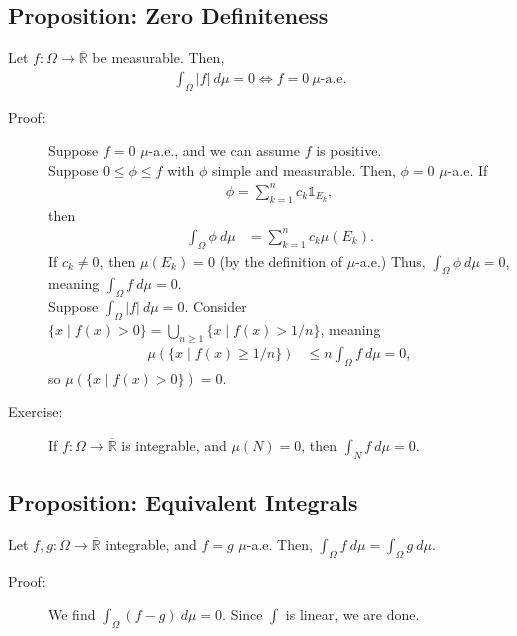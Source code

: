 \documentclass[9pt]{extarticle}
\newcommand{\R}{\mathbb{R}}
\begin{document}
  \subsection{Proposition: Zero Definiteness}%
  Let $f: \Omega \rightarrow \overline{\R}$ be measurable. Then,
  \begin{align*}
    \int_{\Omega}|f|~d\mu = 0 \Leftrightarrow f = 0~\text{$\mu$-a.e.}
  \end{align*}
  \begin{description}
    \item[Proof:] Suppose $f = 0$ $\mu$-a.e., and we can assume $f$ is positive.\\

      Suppose $0 \leq \phi \leq f$ with $\phi$ simple and measurable. Then, $\phi = 0$ $\mu$-a.e. If
      \begin{align*}
        \phi = \sum_{k=1}^{n}c_k\mathbb{1}_{E_k},
      \end{align*}
      then
      \begin{align*}
        \int_{\Omega}\phi~d\mu &= \sum_{k=1}^{n}c_k\mu(E_k).
      \end{align*}
      If $c_k \neq 0$, then $\mu(E_k) = 0$ (by the definition of $\mu$-a.e.) Thus, $\int_{\Omega}\phi~d\mu = 0$, meaning $\int_{\Omega}f~d\mu = 0$.\\

      Suppose $\int_{\Omega}|f|~d\mu = 0$. Consider $\{x\mid f(x) > 0\} = \bigcup_{n\geq 1} \{x\mid f(x)>1/n\}$, meaning
      \begin{align*}
        \mu\left(\{x\mid f(x) \geq 1/n\}\right) &\leq n\int_{\Omega}f~d\mu = 0,\tag*{Chebyshev's Inequality}
      \end{align*}
      so $\mu\left(\{x\mid f(x) > 0\}\right) = 0$.
    \item[Exercise:] If $f: \Omega \rightarrow \overline{\R}$ is integrable, and $\mu(N) = 0$, then $\int_{N}f~d\mu =0$.
  \end{description}
  \subsection{Proposition: Equivalent Integrals}%
  Let $f,g: \Omega \rightarrow \overline{\R}$ integrable, and $f = g$ $\mu$-a.e. Then, $\int_{\Omega}f~d\mu = \int_{\Omega}g~d\mu$.
  \begin{description}
    \item[Proof:] We find $\int_{\Omega}(f-g)~d\mu = 0$. Since $\int$ is linear, we are done.
  \end{description}
\end{document}
